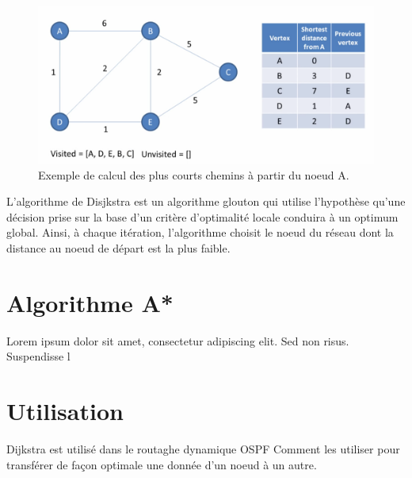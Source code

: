  


\begin{figure}[htp]
  \centering
  \includegraphics[width=15cm]{images/algo_dij}
  \caption{Exemple de calcul des plus courts chemins à partir du noeud A.}
  \label{fig:une-autre-image}
\end{figure}

L'algorithme de Disjkstra est un algorithme glouton qui utilise l'hypothèse qu'une décision prise sur la base
d'un critère d'optimalité locale conduira à un optimum global. Ainsi, à chaque itération, l'algorithme choisit le noeud
du réseau dont la distance au noeud de départ est la plus faible.
%   

\section{Algorithme A*}
Lorem ipsum dolor sit amet, consectetur adipiscing elit. Sed non risus. Suspendisse l
\section{Utilisation}

Dijkstra est utilisé dans le routaghe dynamique OSPF
Comment les utiliser pour transférer de façon optimale une donnée d'un noeud à un autre. 


